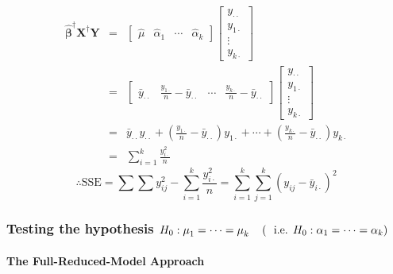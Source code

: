 \documentclass{article}
\begin{document}
\begin{eqnarray*}
\mathbf{\hat{\beta}}^{\dagger }\mathbf{X}^{\dagger }\mathbf{Y} &=&\left[ 
\begin{array}{cccc}
\hat{\mu} & \hat{\alpha}_{1} & \cdots  & \hat{\alpha}_{k}%
\end{array}%
\right] \left[ 
\begin{array}{c}
y_{\cdot \cdot } \\ 
y_{1\cdot } \\ 
\vdots  \\ 
y_{k\cdot }%
\end{array}%
\right]  \\
&=&\left[ 
\begin{array}{cccc}
\bar{y}_{\cdot \cdot } & \frac{y_{1\cdot }}{n}-\bar{y}_{\cdot \cdot } & 
\cdots  & \frac{y_{k\cdot }}{n}-\bar{y}_{\cdot \cdot }%
\end{array}%
\right] \left[ 
\begin{array}{c}
y_{\cdot \cdot } \\ 
y_{1\cdot } \\ 
\vdots  \\ 
y_{k\cdot }%
\end{array}%
\right]  \\
&=&\bar{y}_{\cdot \cdot }y_{\cdot \cdot }+\left( \frac{y_{1\cdot }}{n}-\bar{y%
}_{\cdot \cdot }\right) y_{1\cdot }+\cdots +\left( \frac{y_{k\cdot }}{n}-%
\bar{y}_{\cdot \cdot }\right) y_{k\cdot } \\
&=&\sum\limits_{i=1}^{k}\frac{y_{i\cdot }^{2}}{n}
\end{eqnarray*}%
\begin{equation*}
\therefore \text{SSE}=\sum \sum y_{ij}^{2}-\sum_{i=1}^{k}\frac{y_{i\cdot
}^{2}}{n}=\sum_{i=1}^{k}\sum_{j=1}^{k}\left( y_{ij}-\bar{y}_{i\cdot }\right)
^{2}
\end{equation*}

\bigskip

\subsubsection{Testing the hypothesis $H_{0}:\protect\mu _{1}=\cdots =%
\protect\mu _{k}\quad \left( \text{i.e. }H_{0}:\protect\alpha _{1}=\cdots =%
\protect\alpha _{k}\right) $}

\paragraph{The Full-Reduced-Model Approach}
\end{document}
